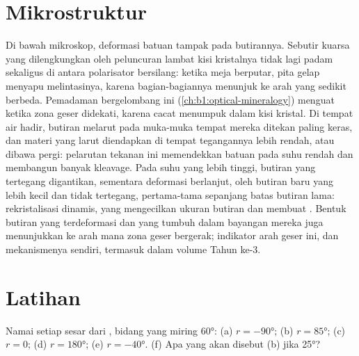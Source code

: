 \begin{omfigure}
\label{fig:b1:faults-folds-fabrics:vergence}
\end{omfigure}

\section{Mikrostruktur}\label{sec:b1:faults-folds-fabrics:micro}

Di bawah mikroskop, deformasi batuan tampak pada butirannya. Sebutir kuarsa yang dilengkungkan oleh peluncuran lambat kisi kristalnya tidak lagi padam sekaligus di antara polarisator bersilang: ketika meja berputar, pita gelap menyapu melintasinya, karena bagian-bagiannya menunjuk ke arah yang sedikit berbeda. Pemadaman bergelombang ini (\cref{ch:b1:optical-mineralogy}) menguat ketika zona geser didekati, karena cacat menumpuk dalam kisi kristal. Di tempat air hadir, butiran melarut pada muka-muka tempat mereka ditekan paling keras, dan materi yang larut diendapkan di tempat tegangannya lebih rendah, atau dibawa pergi: pelarutan tekanan ini memendekkan batuan pada suhu rendah dan membangun banyak kleavage. Pada suhu yang lebih tinggi, butiran yang tertegang digantikan, sementara deformasi berlanjut, oleh butiran baru yang lebih kecil dan tidak tertegang, pertama-tama sepanjang batas butiran lama: rekristalisasi dinamis, yang mengecilkan ukuran butiran dan membuat . Bentuk butiran yang terdeformasi dan  yang tumbuh dalam bayangan mereka juga menunjukkan ke arah mana zona geser bergerak; indikator arah geser ini, dan mekanismenya sendiri, termasuk dalam volume Tahun ke-3.

\section{Latihan}

\begin{exercise}[$\star$]\label{exo:b1:faults-folds-fabrics:1}
Namai setiap sesar dari  , bidang yang miring \ang{60}: (a) $r = \ang{-90}$; (b) $r = \ang{85}$; (c) $r = 0$; (d) $r = \ang{180}$; (e) $r = \ang{-40}$. (f) Apa yang akan disebut (b) jika  \ang{25}?
\end{exercise}

